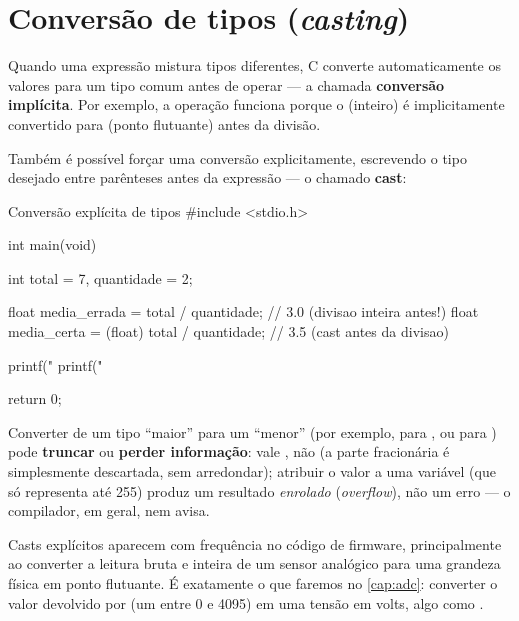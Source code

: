 \section{Conversão de tipos (\emph{casting})}

Quando uma expressão mistura tipos diferentes, C converte automaticamente os valores para um tipo comum antes de operar — a chamada \textbf{conversão implícita}. Por exemplo, a operação  funciona porque o  (inteiro) é implicitamente convertido para  (ponto flutuante) antes da divisão.

Também é possível forçar uma conversão explicitamente, escrevendo o tipo desejado entre parênteses antes da expressão — o chamado \textbf{cast}:

\begin{codigoc}{Conversão explícita de tipos}
#include <stdio.h>

int main(void) {
    int total = 7, quantidade = 2;

    float media_errada = total / quantidade;          // 3.0 (divisao inteira antes!)
    float media_certa  = (float) total / quantidade;   // 3.5 (cast antes da divisao)

    printf("%
    printf("%

    return 0;
}
\end{codigoc}

\begin{atencao}
Converter de um tipo ``maior'' para um ``menor'' (por exemplo,  para , ou  para ) pode \textbf{truncar} ou \textbf{perder informação}:  vale , não  (a parte fracionária é simplesmente descartada, sem arredondar); atribuir o valor  a uma variável  (que só representa até 255) produz um resultado \emph{enrolado} (\emph{overflow}), não um erro — o compilador, em geral, nem avisa.
\end{atencao}

\begin{esp32box}
Casts explícitos aparecem com frequência no código de firmware, principalmente ao converter a leitura bruta e inteira de um sensor analógico para uma grandeza física em ponto flutuante. É exatamente o que faremos no \cref{cap:adc}: converter o valor devolvido por  (um  entre 0 e 4095) em uma tensão em volts, algo como .
\end{esp32box}

